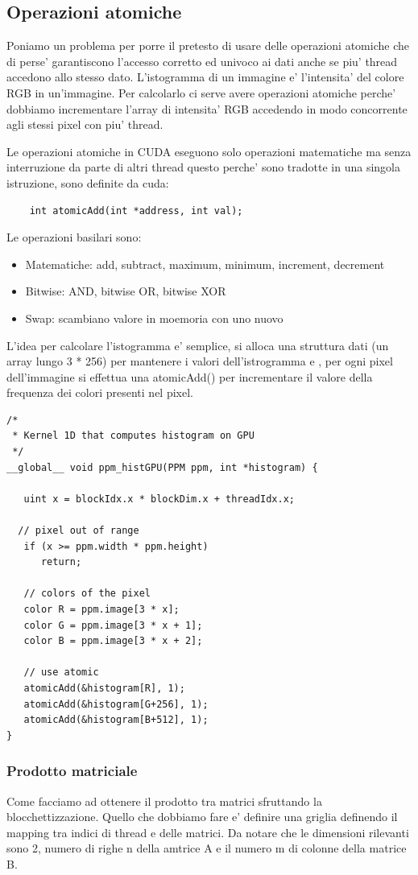 \subsection{Operazioni atomiche}
Poniamo un problema per porre il pretesto di usare delle operazioni atomiche che di perse' garantiscono l'accesso corretto ed univoco ai dati anche se piu' thread accedono allo stesso dato.
L'istogramma di un immagine e' l'intensita' del colore RGB in un'immagine. Per calcolarlo ci serve avere operazioni atomiche perche' dobbiamo incrementare l'array di intensita' RGB accedendo in modo concorrente agli stessi pixel con piu' thread.

Le operazioni atomiche in CUDA eseguono solo operazioni matematiche ma senza interruzione da parte di altri thread questo perche' sono tradotte in una singola istruzione, sono definite da cuda:
\begin{lstlisting}
    int atomicAdd(int *address, int val);
\end{lstlisting}

Le operazioni basilari sono:
\begin{itemize}
    \item Matematiche: add, subtract, maximum, minimum, increment, decrement
    \item Bitwise: AND, bitwise OR, bitwise XOR
    \item Swap: scambiano valore in moemoria con uno nuovo
\end{itemize}

L'idea per calcolare l'istogramma e' semplice, si alloca una struttura dati (un array lungo 3 * 256) per mantenere i valori dell'istrogramma e , per ogni pixel dell'immagine si effettua una atomicAdd() per incrementare il valore della frequenza dei colori presenti nel pixel.

\begin{lstlisting}
/*
 * Kernel 1D that computes histogram on GPU
 */
__global__ void ppm_histGPU(PPM ppm, int *histogram) {

   uint x = blockIdx.x * blockDim.x + threadIdx.x;

  // pixel out of range
   if (x >= ppm.width * ppm.height)
      return;

   // colors of the pixel
   color R = ppm.image[3 * x];
   color G = ppm.image[3 * x + 1];
   color B = ppm.image[3 * x + 2];

   // use atomic
   atomicAdd(&histogram[R], 1);
   atomicAdd(&histogram[G+256], 1);
   atomicAdd(&histogram[B+512], 1);
}
\end{lstlisting}

\subsubsection{Prodotto matriciale}
Come facciamo ad ottenere il prodotto tra matrici sfruttando la blocchettizzazione. Quello che dobbiamo fare e' definire una griglia definendo il mapping tra indici di thread e delle matrici. Da notare che le dimensioni rilevanti sono 2, numero di righe n della amtrice A e il numero m di colonne della matrice B. 